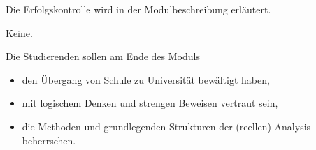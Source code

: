 \begin{course}

\setdoclanguagegerman
{}



\coursehead


\label{cour_6987.dp_997}


\begin{styleenv}
\begin{assessment}
Die Erfolgskontrolle wird in der Modulbeschreibung erläutert.


\end{assessment}

\begin{conditions}Keine.\end{conditions}


\end{styleenv}

\begin{learningoutcomes}
Die Studierenden sollen am Ende des Moduls

 \begin{itemize}\item den Übergang von Schule zu Universität bewältigt haben,  \item mit logischem Denken und strengen Beweisen vertraut sein,  \item die Methoden und grundlegenden Strukturen der (reellen) Analysis beherrschen.  \end{itemize}
\end{learningoutcomes}


\end{course}
